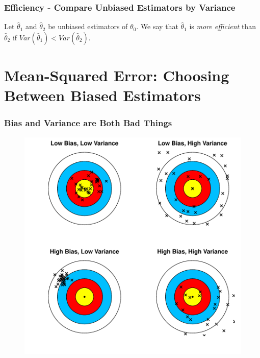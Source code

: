 \begin{frame}
\frametitle{Efficiency - Compare Unbiased Estimators by Variance}
Let $\widehat{\theta}_1$ and $\widehat{\theta}_2$ be unbiased estimators of $\theta_0$. We say that $\widehat{\theta}_1$ is \alert{\emph{more efficient}} than $\widehat{\theta}_2$ if $Var(\widehat{\theta}_1)<Var(\widehat{\theta}_2)$.
\end{frame}

\section{Mean-Squared Error: Choosing Between Biased Estimators}
\begin{frame}
  \frametitle{Bias and Variance are Both Bad Things}
  \begin{figure}
    \centering
  \includegraphics[scale = 0.55]{./images/bias-variance-dartboard.pdf}
\end{figure}
\end{frame}
